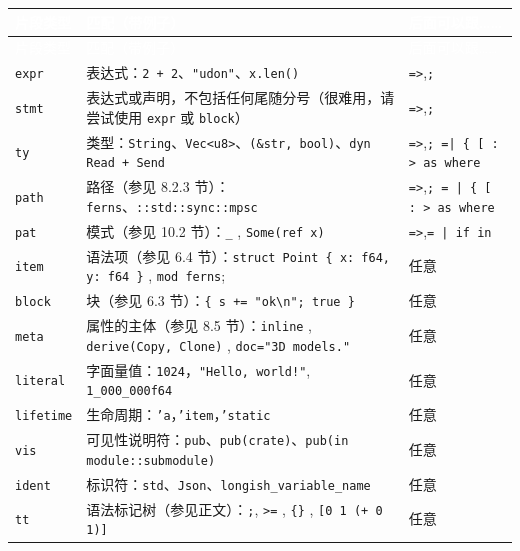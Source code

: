 \myTableBegin
\begin{xltabular}{\textwidth}{@{}>{\hsize\raggedright\arraybackslash}X>{\hsize\raggedright\arraybackslash}X>{\hsize\raggedright\arraybackslash}X@{}}
\textcolor{white}{片段类型} & \textcolor{white}{匹配（带例子）} & \textcolor{white}{后面可以跟……} \\
\endfirsthead
{}\textcolor{white}{片段类型} & \textcolor{white}{匹配（带例子）} & \textcolor{white}{后面可以跟……} \\
\endhead
\texttt{expr} & 表达式：\newline{}\texttt{2 + 2}、\texttt{"udon"}、\texttt{x.len()} & \texttt{=>},\texttt{;} \\
\texttt{stmt} & 表达式或声明，不包括任何尾随分号（很难用，请尝试使用 \texttt{expr} 或 \texttt{block}） & \texttt{=>},\texttt{;} \\
\texttt{ty} & 类型：\newline{}\texttt{String}、\texttt{Vec<u8>}、\texttt{(\&str, bool)}、\texttt{dyn Read + Send} & \texttt{=>},\texttt{; =| \{ [ : > as where} \\
\texttt{path} & 路径（参见 8.2.3 节）：\newline{}\texttt{ferns}、\texttt{::std::sync::mpsc} & \texttt{=>},\texttt{; = | \{ [ : > as where} \\
\texttt{pat} & 模式（参见 10.2 节）：\newline{}\texttt{\_} , \texttt{Some(ref x)} & \texttt{=>},\texttt{= | if in} \\
\texttt{item} & 语法项（参见 6.4 节）：\newline{}\texttt{struct Point \{ x: f64, y: f64 \}} , \texttt{mod ferns}; & 任意 \\
\texttt{block} & 块（参见 6.3 节）：\newline{}\texttt{\{ s += "ok\textbackslash{}n"; true \}} & 任意 \\
\texttt{meta} & 属性的主体（参见 8.5 节）：\newline{}\texttt{inline} , \texttt{derive(Copy, Clone)} , \texttt{doc="3D models."} & 任意 \\
\texttt{literal} & 字面量值：\newline{}\texttt{1024}，\texttt{"Hello, world!"}, \texttt{1\_000\_000f64} & 任意 \\
\texttt{lifetime} & 生命周期：\newline{}\texttt{'a}，\texttt{'item}，\texttt{'static} & 任意 \\
\texttt{vis} & 可见性说明符：\newline{}\texttt{pub}、\texttt{pub(crate)}、\texttt{pub(in module::submodule)} & 任意 \\
\texttt{ident} & 标识符：\newline{}\texttt{std}、\texttt{Json}、\texttt{longish\_variable\_name} & 任意 \\
\texttt{tt} & 语法标记树（参见正文）：\newline{}\texttt{;}, \texttt{>=} , \texttt{\{\}} , \texttt{[0 1 (+ 0 1)]} & 任意 \\
\end{xltabular}
\myTableEnd

